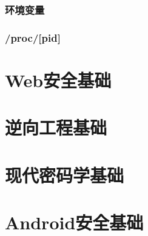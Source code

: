 \subsubsection{环境变量}
\indent \setlength{\parindent}{2em}

\subsubsection{/proc/[pid]}
\indent \setlength{\parindent}{2em}

\section{Web安全基础}
\indent \setlength{\parindent}{2em}

\section{逆向工程基础}
\indent \setlength{\parindent}{2em}

\section{现代密码学基础}
\indent \setlength{\parindent}{2em}

\section{Android安全基础}
\indent \setlength{\parindent}{2em}

